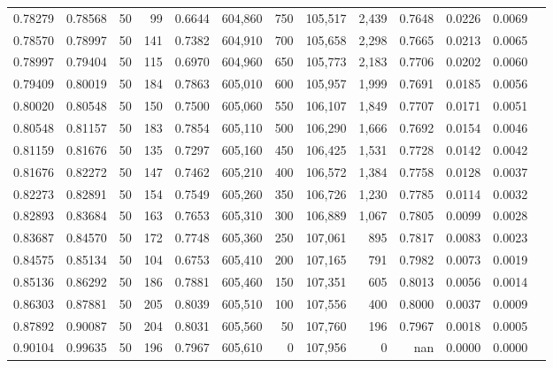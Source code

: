 \begin{tabular}{rrrrrrrrrrrrr}
0.78279 & 0.78568 &    50 &  99 &                                     0.6644 & 604,860 &     750 & 105,517 &   2,439 & 0.7648 & 0.0226 & 0.0069 \\
0.78570 & 0.78997 &    50 & 141 &                                     0.7382 & 604,910 &     700 & 105,658 &   2,298 & 0.7665 & 0.0213 & 0.0065 \\
0.78997 & 0.79404 &    50 & 115 &                                     0.6970 & 604,960 &     650 & 105,773 &   2,183 & 0.7706 & 0.0202 & 0.0060 \\
0.79409 & 0.80019 &    50 & 184 &                                     0.7863 & 605,010 &     600 & 105,957 &   1,999 & 0.7691 & 0.0185 & 0.0056 \\
0.80020 & 0.80548 &    50 & 150 &                                     0.7500 & 605,060 &     550 & 106,107 &   1,849 & 0.7707 & 0.0171 & 0.0051 \\
0.80548 & 0.81157 &    50 & 183 &                                     0.7854 & 605,110 &     500 & 106,290 &   1,666 & 0.7692 & 0.0154 & 0.0046 \\
0.81159 & 0.81676 &    50 & 135 &                                     0.7297 & 605,160 &     450 & 106,425 &   1,531 & 0.7728 & 0.0142 & 0.0042 \\
0.81676 & 0.82272 &    50 & 147 &                                     0.7462 & 605,210 &     400 & 106,572 &   1,384 & 0.7758 & 0.0128 & 0.0037 \\
0.82273 & 0.82891 &    50 & 154 &                                     0.7549 & 605,260 &     350 & 106,726 &   1,230 & 0.7785 & 0.0114 & 0.0032 \\
0.82893 & 0.83684 &    50 & 163 &                                     0.7653 & 605,310 &     300 & 106,889 &   1,067 & 0.7805 & 0.0099 & 0.0028 \\
0.83687 & 0.84570 &    50 & 172 &                                     0.7748 & 605,360 &     250 & 107,061 &     895 & 0.7817 & 0.0083 & 0.0023 \\
0.84575 & 0.85134 &    50 & 104 &                                     0.6753 & 605,410 &     200 & 107,165 &     791 & 0.7982 & 0.0073 & 0.0019 \\
0.85136 & 0.86292 &    50 & 186 &                                     0.7881 & 605,460 &     150 & 107,351 &     605 & 0.8013 & 0.0056 & 0.0014 \\
0.86303 & 0.87881 &    50 & 205 &                                     0.8039 & 605,510 &     100 & 107,556 &     400 & 0.8000 & 0.0037 & 0.0009 \\
0.87892 & 0.90087 &    50 & 204 &                                     0.8031 & 605,560 &      50 & 107,760 &     196 & 0.7967 & 0.0018 & 0.0005 \\
0.90104 & 0.99635 &    50 & 196 &                                     0.7967 & 605,610 &       0 & 107,956 &       0 &    nan & 0.0000 & 0.0000 \\
\bottomrule
\end{tabular}
